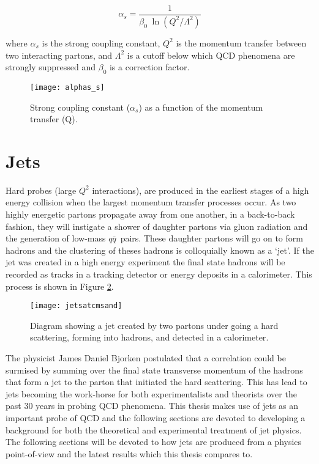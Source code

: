 \begin{equation}
\alpha_{s} = \frac{1}{\beta_{0} \; \ln(Q^{2}/\Lambda^{2} )}
\label{eq:alpha_s}
\end{equation}

\noindent
where $\alpha_{s}$ is the strong coupling constant, $Q^{2}$ is the momentum transfer between two interacting partons, and $\Lambda^{2}$ is a cutoff below which QCD phenomena are strongly suppressed and $\beta_{0}$ is a correction factor.

\begin{figure}[h]
\texttt{[image: alphas\_s]}
\centering
\caption{Strong coupling constant ($\alpha_{s}$) as a function of the momentum transfer (Q)\cite{CMS:2014mna}.}
\label{fig:as}
\end{figure}

\section{Jets}

Hard probes (large $Q^{2}$ interactions), are produced in the earliest stages of a high energy collision when the largest momentum transfer processes occur.  As two highly energetic partons propagate away from one another, in a back-to-back fashion, they will instigate a shower of daughter partons via gluon radiation and the generation of low-mass $q \bar{q}$\, pairs.  These daughter partons will go on to form hadrons and the clustering of theses hadrons is colloquially known as a `jet'.  If the jet was created in a high energy experiment the final state hadrons will be recorded as tracks in a tracking detector or energy deposits in a calorimeter.  This process is shown in Figure \ref{fig:MakeAJet}.



\begin{figure}[h]
\texttt{[image: jetsatcmsand]}
\centering
\caption{Diagram showing a jet created by two partons under going a hard scattering, forming into hadrons, and detected in a calorimeter\cite{JetPic}.}
\label{fig:MakeAJet}
\end{figure}

The physicist James Daniel Bjorken postulated that a correlation could be surmised by summing over the final state transverse momentum of the hadrons that form a jet to the parton that initiated the hard scattering\cite{PhysRev.179.1547}\cite{Bjorken:1973kd}.  This has lead to jets becoming the work-horse for both experimentalists and theorists over the past 30 years in probing QCD phenomena.  This thesis makes use of jets as an important probe of QCD and the following sections are devoted to developing a background for both the theoretical and experimental treatment of jet physics.  The following sections will be devoted to how jets are produced from a physics point-of-view and the latest results which this thesis compares to.

